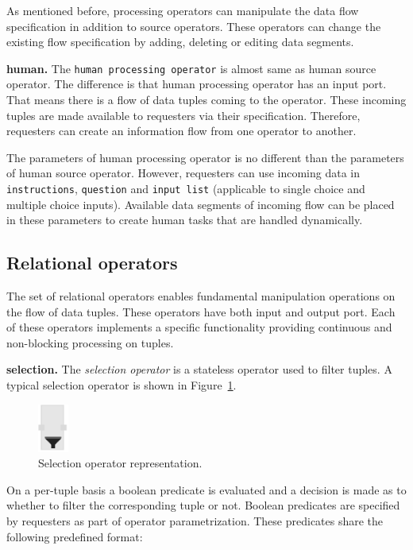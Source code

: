 As mentioned before, processing operators can manipulate the data flow specification 
in addition to source operators. These operators can change the existing flow specification 
by adding, deleting or editing data segments.

\textbf{human.}
The \texttt{human processing operator} is almost same as human source operator. 
The difference is that human processing operator has an input port. That means there is a 
flow of data tuples coming to the operator. These incoming tuples are made available 
to requesters via their specification. Therefore, requesters can create an information 
flow from one operator to another.

The parameters of human processing operator is no different than the parameters of 
human source operator. However, requesters can use incoming data in 
\texttt{instructions}, \texttt{question} and \texttt{input list} (applicable to single choice 
and multiple choice inputs). Available data segments of incoming flow can be placed 
in these parameters to create human tasks that are handled dynamically.

\subsection{Relational operators}
The set of relational operators enables fundamental manipulation operations on 
the flow of data tuples. These operators have both input and output port. Each of 
these operators implements a specific functionality providing continuous and 
non-blocking processing on tuples.

\textbf{selection.}
The \textit{selection operator} is a stateless operator used to filter tuples. A typical 
selection operator is shown in Figure~\ref{fig:selection operator}.

\begin{figure}[ht]
	\centering
	\includegraphics[height=60px]{figures/SelectionOperator.pdf}
	\caption{Selection operator representation.}
	\label{fig:selection operator}
\end{figure}

On a per-tuple basis a boolean predicate is evaluated and a decision is made as 
to whether to filter the corresponding tuple or not. Boolean predicates are specified 
by requesters as part of operator parametrization. These predicates share the 
following predefined format:

